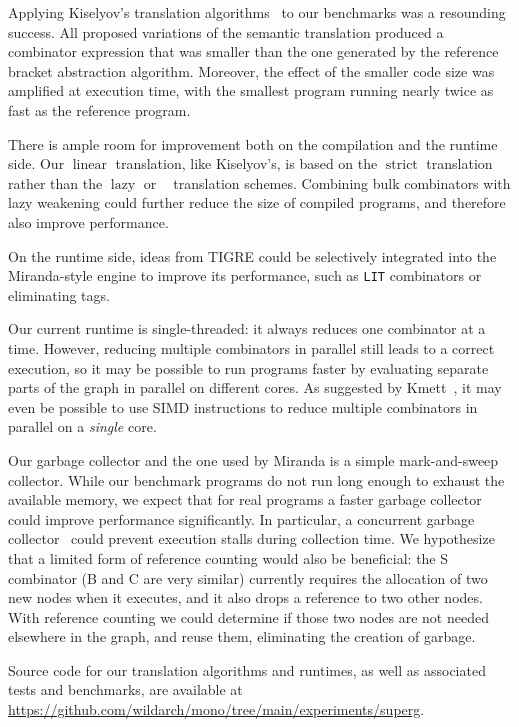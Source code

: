 \documentclass[conference]{IEEEtran}
\DeclareMathOperator{\strict}{strict}
\DeclareMathOperator{\lazy}{lazy}
\DeclareMathOperator{\lazyeta}{lazy_\eta}
\DeclareMathOperator{\linear}{linear}
\begin{document}
Applying Kiselyov's translation algorithms~\cite{kiselyov_lambda_2018} to our benchmarks was a resounding success.
All proposed variations of the semantic translation produced a combinator expression that was smaller than the one generated by the reference bracket abstraction algorithm.
Moreover, the effect of the smaller code size was amplified at execution time, with the smallest program running nearly twice as fast as the reference program.

There is ample room for improvement both on the compilation and the runtime side.
Our $\linear$ translation, like Kiselyov's, is based on the $\strict$ translation rather than the $\lazy$ or $\lazyeta$ translation schemes.
Combining bulk combinators with lazy weakening could further reduce the size of compiled programs, and therefore also improve performance.

On the runtime side, ideas from TIGRE could be selectively integrated into the Miranda-style engine to improve its performance, such as \texttt{LIT} combinators or eliminating tags.

Our current runtime is single-threaded: it always reduces one combinator at a time.
However, reducing multiple combinators in parallel still leads to a correct execution, so it may be possible to run programs faster by evaluating separate parts of the graph in parallel on different cores.
As suggested by Kmett~\cite{kmett_combinators_2018}, it may even be possible to use SIMD instructions to reduce multiple combinators in parallel on a \emph{single} core.

Our garbage collector and the one used by Miranda is a simple mark-and-sweep collector.
While our benchmark programs do not run long enough to exhaust the available memory, we expect that for real programs a faster garbage collector could improve performance significantly.
In particular, a concurrent garbage collector~\cite{jones_garbage_2011} could prevent execution stalls during collection time.
We hypothesize that a limited form of reference counting would also be beneficial: the S combinator (B and C are very similar) currently requires the allocation of two new nodes when it executes, and it also drops a reference to two other nodes.
With reference counting we could determine if those two nodes are not needed elsewhere in the graph, and reuse them, eliminating the creation of garbage.

Source code for our translation algorithms and runtimes, as well as associated tests and benchmarks, are available at \url{https://github.com/wildarch/mono/tree/main/experiments/superg}.
\end{document}
